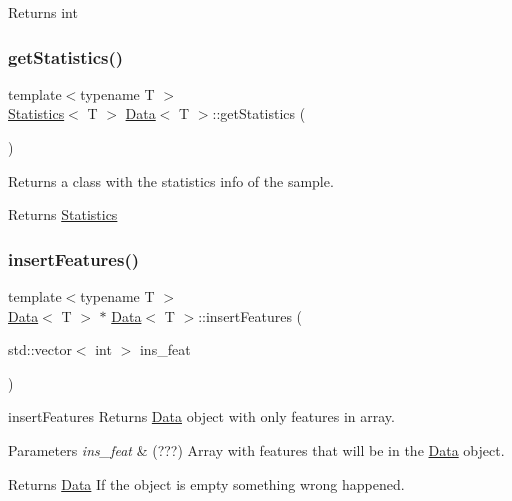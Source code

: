 \begin{DoxyReturn}{Returns}
int 
\end{DoxyReturn}
\mbox{\label{class_data_a7ca936cd8cbde912283f5feee441717a}} 
\subsubsection{\texorpdfstring{get\+Statistics()}{getStatistics()}}
{\footnotesize\ttfamily template$<$typename T $>$ \\
\hyperlink{class_statistics}{Statistics}$<$ T $>$ \hyperlink{class_data}{Data}$<$ T $>$\+::get\+Statistics (\begin{DoxyParamCaption}{ }\end{DoxyParamCaption})}



Returns a class with the statistics info of the sample. 

\begin{DoxyReturn}{Returns}
\hyperlink{class_statistics}{Statistics} 
\end{DoxyReturn}
\mbox{\label{class_data_adfd307ae8437b7b2da4372eb604a2c43}} 
\subsubsection{\texorpdfstring{insert\+Features()}{insertFeatures()}}
{\footnotesize\ttfamily template$<$typename T $>$ \\
\hyperlink{class_data}{Data}$<$ T $>$ $\ast$ \hyperlink{class_data}{Data}$<$ T $>$\+::insert\+Features (\begin{DoxyParamCaption}\item[{std\+::vector$<$ int $>$}]{ins\+\_\+feat }\end{DoxyParamCaption})}



insert\+Features Returns \hyperlink{class_data}{Data} object with only features in array. 


\begin{DoxyParams}{Parameters}
{\em ins\+\_\+feat} & (???) Array with features that will be in the \hyperlink{class_data}{Data} object. \\
\hline
\end{DoxyParams}
\begin{DoxyReturn}{Returns}
\hyperlink{class_data}{Data} If the object is empty something wrong happened. 
\end{DoxyReturn}
\mbox{\label{class_data_a2357782011d11c06500b1d752b9428c6}} 
